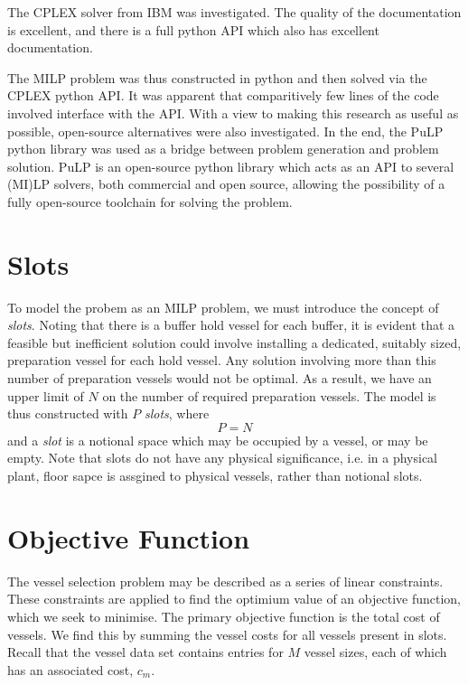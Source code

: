 The CPLEX solver from IBM was investigated.
The quality of the documentation is excellent, and there is a full python API
which also has excellent documentation.

The MILP problem was thus constructed in python and then solved via the CPLEX
python API.
It was apparent that comparitively few lines of the code involved interface
with the API.
With a view to making this research as useful as possible, open-source
alternatives were also investigated.
In the end, the PuLP python library was used as a bridge between problem
generation and problem solution.
PuLP is an open-source python library which acts as an API to several
(MI)LP solvers, both commercial and open source, allowing the possibility of a
fully open-source toolchain for solving the problem.

\section{Slots}\label{S.slots}

To model the probem as an MILP problem, we must introduce the concept of
\emph{slots}.
Noting that there is a buffer hold vessel for each buffer, it is evident that
a feasible but inefficient solution could involve installing a dedicated,
suitably sized, preparation vessel for each hold vessel.
Any solution involving more than this number of preparation vessels would not
be optimal.
As a result, we have an upper limit of $N$ on the number of required
preparation vessels.
The model is thus constructed with $P$ \emph{slots}, where
\begin{equation}
    P = N
\end{equation}
and a \emph{slot} is a notional space which may be occupied by a vessel, or may
be empty.
Note that slots do not have any physical significance, i.e. in a physical
plant, floor sapce is assgined to physical vessels, rather than notional slots.

\section{Objective Function}\label{S.objfn}

The vessel selection problem may be described as a series of linear constraints.
These constraints are applied to find the optimium value of an objective
function, which we seek to minimise.
The primary objective function is the total cost of vessels.
We find this by summing the vessel costs for all vessels present in slots.
Recall that the vessel data set contains entries for $M$ vessel sizes, each
of which has an associated cost, $c_{m}$.


